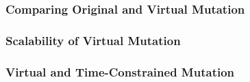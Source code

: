 
\subsubsection{Comparing Original and Virtual Mutation}
\label{sec:empirical-study-RQ-original-virtual-time}



\subsubsection{Scalability of Virtual Mutation}
\label{sec:empirical-study-RQ-mutants-tests}



\subsubsection{Virtual and Time-Constrained Mutation}
\label{sec:empirical-study-RQ-virtual-time-constrained-virtual}


